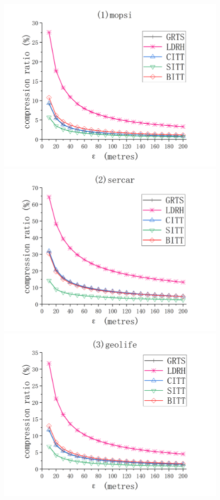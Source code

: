 {\begin{figure}[tb!]
	\centering
	\includegraphics[scale = 0.580]{figures/Fig-mopsi-compression-ratio.png}\hspace{-1ex}
	\includegraphics[scale = 0.580]{figures/Fig-sercar-compression-ratio.png}\hspace{-1ex}
	\includegraphics[scale = 0.580]{figures/Fig-geolife-compression-ratio.png}\hspace{0ex}

\end{figure}}
